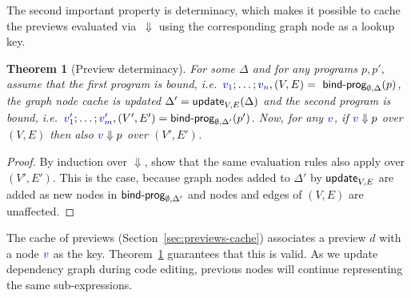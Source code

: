 \documentclass[english,submission]{programming}
\newcounter{thc}
\theoremstyle{plain}
\newtheorem{theorem}[thc]{Theorem}
\theoremstyle{definition}
\newcommand{\ident}[1]{\textnormal{\textcolor{idclr}{\sffamily #1}}}
\newcommand{\bndclr}[1]{\textcolor{kvdclr}{#1}}
\begin{document}
The second important property is determinacy, which makes it possible to cache the previews
evaluated via~$\Downarrow$ using the corresponding graph node as a lookup key.

\begin{theorem}[Preview determinacy]
\label{thm:determinacy}
For some $\Delta$ and for any programs $p, p'$, assume that the first program is bound,
i.e.~$\bndclr{v_1};\ldots;\bndclr{v_n}, (V, E) = \ident{bind-prog}_{\emptyset, \Delta}(p)$,
the graph node cache is updated $\Delta' = \ident{update}_{V, E}(\Delta)$ and the second program is
bound, i.e.~$\bndclr{v'_1};\ldots;\bndclr{v'_m}, (V', E') = \ident{bind-prog}_{\emptyset, \Delta'}(p')$.
Now, for any $\bndclr{v}$, if $\bndclr{v} \Downarrow p$ over $(V, E)$ then also
 $\bndclr{v} \Downarrow p$ over $(V', E')$.
\end{theorem}
\begin{proof}
By induction over $\Downarrow$, show that the same evaluation rules also
apply over $(V', E')$. This is the case, because graph nodes added to $\Delta'$ by $\ident{update}_{V, E}$
are added as new nodes in $\ident{bind-prog}_{\emptyset, \Delta'}$ and
nodes and edges of $(V, E)$ are unaffected.
\end{proof}

\noindent
The cache of previews (Section~\ref{sec:previews-cache}) associates a preview $d$ with a node
$\bndclr{v}$ as the key. Theorem~\ref{thm:determinacy} guarantees that this is valid. As we update dependency
graph during code editing, previous nodes will continue representing the same sub-expressions.


\end{document}
